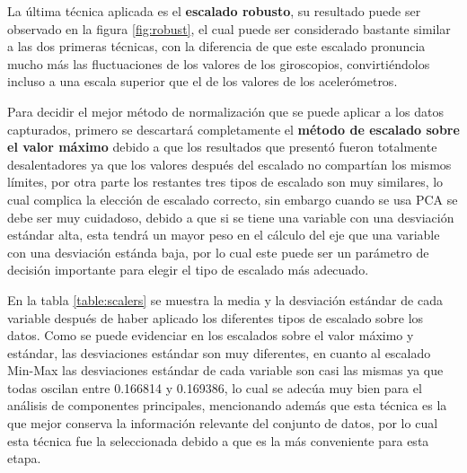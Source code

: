 La \'{u}ltima t\'{e}cnica aplicada es el \textbf{escalado robusto}, su resultado puede ser observado en la figura \ref{fig:robust}, el cual puede ser considerado bastante similar a las dos primeras t\'{e}cnicas, con la diferencia de que este escalado pronuncia mucho m\'{a}s las fluctuaciones de los valores de los giroscopios, convirti\'{e}ndolos incluso a una escala superior que el de los valores de los aceler\'{o}metros.

\vspace{5mm} %

Para decidir el mejor m\'{e}todo de normalizaci\'{o}n que se puede aplicar a los datos capturados, primero se descartar\'{a} completamente el \textbf{m\'{e}todo de escalado sobre el valor m\'{a}ximo} debido a que los resultados que present\'{o} fueron totalmente desalentadores ya que los valores despu\'{e}s del escalado no compart\'{i}an los mismos l\'{i}mites, por otra parte los restantes tres tipos de escalado son muy similares, lo cual complica la elecci\'{o}n de escalado correcto, sin embargo cuando se usa PCA se debe ser muy cuidadoso, debido a que si se tiene una variable con una desviaci\'{o}n est\'{a}ndar alta, esta tendr\'{a} un mayor peso en el c\'{a}lculo del eje que una variable con una desviaci\'{o}n est\'{a}nda baja, por lo cual este puede ser un par\'{a}metro de decisi\'{o}n importante para elegir el tipo de escalado m\'{a}s adecuado.

\vspace{5mm} %

En la tabla \ref{table:scalers} se muestra la media y la desviaci\'{o}n est\'{a}ndar de cada variable despu\'{e}s de haber aplicado los diferentes tipos de escalado sobre los datos. Como se puede evidenciar en los escalados sobre el valor m\'{a}ximo y est\'{a}ndar, las desviaciones est\'{a}ndar son muy diferentes, en cuanto al escalado Min-Max las desviaciones est\'{a}ndar de cada variable son casi las mismas ya que todas oscilan entre 0.166814 y 0.169386, lo cual se adec\'{u}a muy bien para el an\'{a}lisis de componentes principales, mencionando adem\'{a}s que esta t\'{e}cnica es la que mejor conserva la informaci\'{o}n relevante del conjunto de datos, por lo cual esta t\'{e}cnica fue la seleccionada debido a que es la m\'{a}s conveniente para esta etapa.

